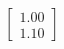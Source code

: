 \documentclass[preview]{standalone}
\begin{document}
\begin{align*}
\begin{bmatrix} 1.00 \\ 1.10 \end{bmatrix}
\end{align*}
\end{document}

